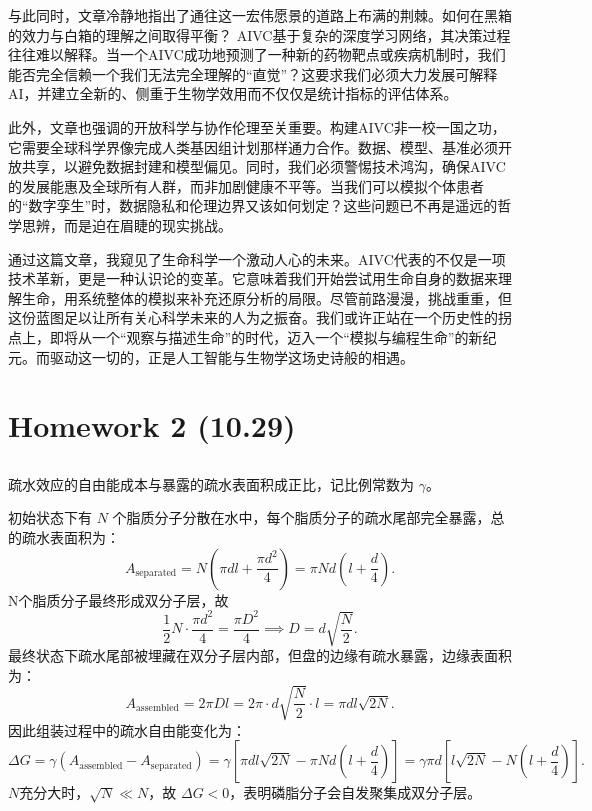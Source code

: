 \documentclass[10pt]{article}
\begin{document}
与此同时，文章冷静地指出了通往这一宏伟愿景的道路上布满的荆棘。如何在黑箱的效力与白箱的理解之间取得平衡？ AIVC基于复杂的深度学习网络，其决策过程往往难以解释。当一个AIVC成功地预测了一种新的药物靶点或疾病机制时，我们能否完全信赖一个我们无法完全理解的``直觉''？这要求我们必须大力发展可解释AI，并建立全新的、侧重于生物学效用而不仅仅是统计指标的评估体系。

此外，文章也强调的开放科学与协作伦理至关重要。构建AIVC非一校一国之功，它需要全球科学界像完成人类基因组计划那样通力合作。数据、模型、基准必须开放共享，以避免数据封建和模型偏见。同时，我们必须警惕技术鸿沟，确保AIVC的发展能惠及全球所有人群，而非加剧健康不平等。当我们可以模拟个体患者的``数字孪生''时，数据隐私和伦理边界又该如何划定？这些问题已不再是遥远的哲学思辨，而是迫在眉睫的现实挑战。

通过这篇文章，我窥见了生命科学一个激动人心的未来。AIVC代表的不仅是一项技术革新，更是一种认识论的变革。它意味着我们开始尝试用生命自身的数据来理解生命，用系统整体的模拟来补充还原分析的局限。尽管前路漫漫，挑战重重，但这份蓝图足以让所有关心科学未来的人为之振奋。我们或许正站在一个历史性的拐点上，即将从一个``观察与描述生命''的时代，迈入一个``模拟与编程生命''的新纪元。而驱动这一切的，正是人工智能与生物学这场史诗般的相遇。

\newpage

\section{Homework 2 (10.29)}

\subsection{}
疏水效应的自由能成本与暴露的疏水表面积成正比，记比例常数为 $\gamma$。

初始状态下有 $N$ 个脂质分子分散在水中，每个脂质分子的疏水尾部完全暴露，总的疏水表面积为：
$$
A_{\text{separated}} = N \left( \pi d l + \frac{\pi d^2}{4} \right) = \pi N d \left( l + \frac{d}{4} \right).
$$
N个脂质分子最终形成双分子层，故
$$
\frac{1}{2}N\cdot \frac{\pi d^2}{4} = \frac{\pi D^2}{4} \implies D = d \sqrt{\frac{N}{2}}.
$$
最终状态下疏水尾部被埋藏在双分子层内部，但盘的边缘有疏水暴露，边缘表面积为：
$$
A_{\text{assembled}} = 2 \pi D l  = 2\pi \cdot d\sqrt{\frac{N}{2}}\cdot l = \pi d l \sqrt{2N}.
$$
因此组装过程中的疏水自由能变化为：
$$
\Delta G = \gamma\left(A_{\text{assembled}}-A_{\text{separated}}\right) =  \gamma \left[ \pi d l \sqrt{2N} - \pi N d \left( l + \frac{d}{4}\right)\right] =  \gamma \pi d \left[ l \sqrt{2 N} - N \left( l + \frac{d}{4} \right) \right].
$$
$N$充分大时，$\sqrt{N} \ll N$，故 $\Delta G < 0$，表明磷脂分子会自发聚集成双分子层。
\end{document}
